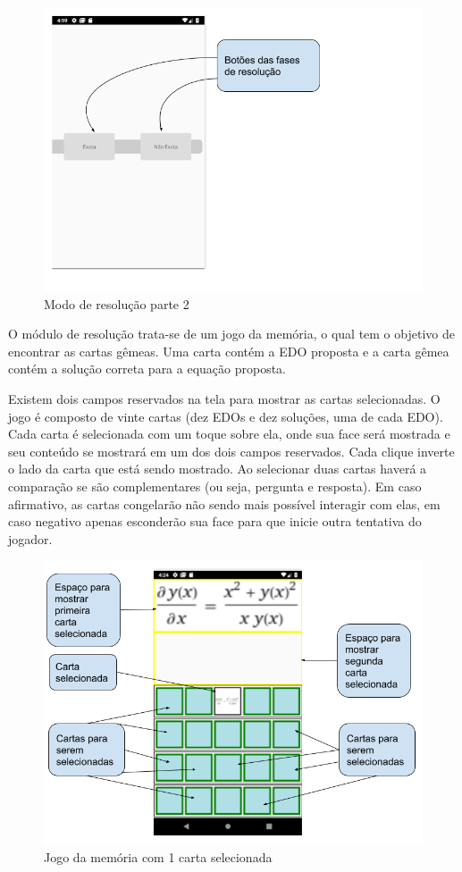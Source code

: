 \begin{figure}[H]
\centering
\caption{Modo de resolução parte 2}
\includegraphics[scale=0.72]{figuras/modo_resolucao_2.png}
\end{figure}


O módulo de resolução trata-se de um jogo da memória, o qual tem o objetivo de encontrar as cartas gêmeas. Uma carta contém a EDO proposta e a carta gêmea contém a solução correta para a equação proposta.

Existem dois campos reservados na tela para mostrar as cartas selecionadas. O jogo é composto de vinte cartas (dez EDOs e dez soluções, uma de cada EDO). Cada carta é selecionada com um toque sobre ela, onde sua face será mostrada e seu conteúdo se mostrará em um dos dois campos reservados. Cada clique inverte o lado da carta que está sendo mostrado. Ao selecionar duas cartas haverá a comparação se são complementares (ou seja, pergunta e resposta). Em caso afirmativo, as cartas congelarão não sendo mais possível interagir com elas, em caso negativo apenas esconderão sua face para que inicie outra tentativa do jogador.

\begin{figure}[H]
\centering
\caption{Jogo da memória com 1 carta selecionada}
\includegraphics[width=\textwidth,height=\textheight,keepaspectratio]{figuras/resolucao_1imagem.png}
\end{figure}

